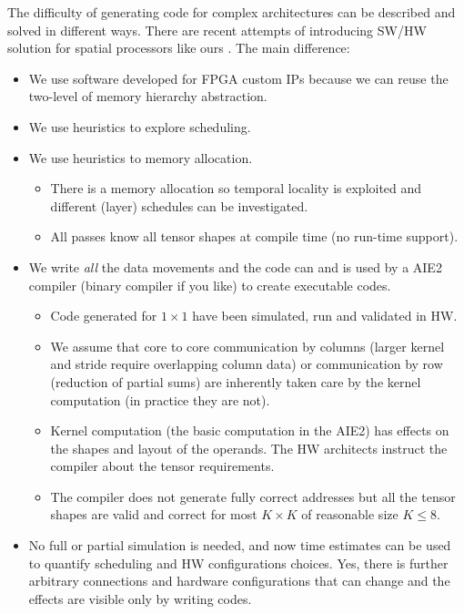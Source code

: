 \documentclass[conference]{IEEEtran}
\begin{document}
The difficulty of generating code for complex architectures can be
described and solved in different ways. There are recent attempts of
introducing SW/HW solution for spatial processors like ours
\cite{Huang2021CoSASB,Russo2023MemoryAwareDA,Cai2023InterlayerSS}. The
main difference:
\begin{itemize}
   \item We use software developed for FPGA custom IPs because we can
     reuse the two-level of memory hierarchy abstraction.
   \item We use heuristics to explore scheduling.
   \item We use heuristics to memory allocation.
     \begin{itemize}
     \item There is a memory allocation so temporal locality is
       exploited and different (layer) schedules can be investigated.
     \item All passes know all tensor shapes at compile time (no
       run-time support).
     \end{itemize}
   \item We write {\em all} the data movements and the code can and is
     used by a AIE2 compiler (binary compiler if you like) to create
     executable codes.
     \begin{itemize}
     \item Code generated for $1\times 1$ have been simulated, run and
       validated in HW.
     \item We assume that core to core communication by columns
       (larger kernel and stride require overlapping column data) or
       communication by row (reduction of partial sums) are inherently
       taken care by the kernel computation (in practice they are
       not).
     \item Kernel computation (the basic computation in the AIE2) has
       effects on the shapes and layout of the operands. The HW
       architects instruct the compiler about the tensor requirements.
     \item The compiler does not generate fully correct addresses but
       all the tensor shapes are valid and correct for most $K\times
       K$ of reasonable size $K\leq 8$.
     \end{itemize}
   \item No full or partial simulation is needed, and now time
     estimates can be used to quantify scheduling and HW
     configurations choices. Yes, there is further arbitrary
     connections and hardware configurations that can change and the
     effects are visible only by writing codes.
\end{itemize}
\end{document}
